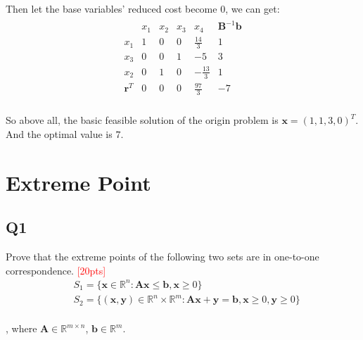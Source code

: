 \documentclass[10pt]{article}
\renewcommand{\mathbf}{\boldsymbol}
\begin{document}
Then let the base variables' reduced cost become $0$, we can get:\\
\begin{equation}
	\begin{aligned}
		\begin{array}{c|cccc|c}
			& x_1 & x_2 & x_3 & x_4 & \mathbf{B}^{-1}\mathbf{b} \\
			\hline
			x_1 & 1 & 0 & 0 & \frac{14}{3} & 1 \\
			x_3 & 0 & 0 & 1 & -5 & 3 \\
			x_2 & 0 & 1 & 0 & -\frac{13}{3} & 1 \\
			\hline
			\mathbf{r}^T & 0 & 0 & 0 & \frac{97}{3} & -7 \\
		\end{array}
	\end{aligned}
\end{equation}

So above all, the basic feasible solution of the origin problem is $\mathbf{x}=(1,1,3,0)^T$.\\
And the optimal value is $7$.\\

\newpage

\section{Extreme Point}
\subsection{Q1}
Prove that the extreme points of the following two sets are in one-to-one correspondence.
\textcolor{red}{[20pts]}
\begin{equation}
	\begin{aligned}
		& S_{1} = \{ \bm{x} \in \mathbb{R}^{n} : \bm{Ax} \leq \bm{b}, \bm{x} \geq 0 \} \\
		& S_{2} = \{ \bm{(x, y)} \in \mathbb{R}^{n} \times \mathbb{R}^{m} : \bm{Ax} + \bm{y} = \bm{b}, \bm{x} \geq 0, \bm{y} \geq 0 \} \\
	\end{aligned}
\end{equation}
 
, where $\bm{A} \in \mathbb{R}^{m \times n}$, $\bm{b} \in \mathbb{R}^{m}$.\\
\end{document}
